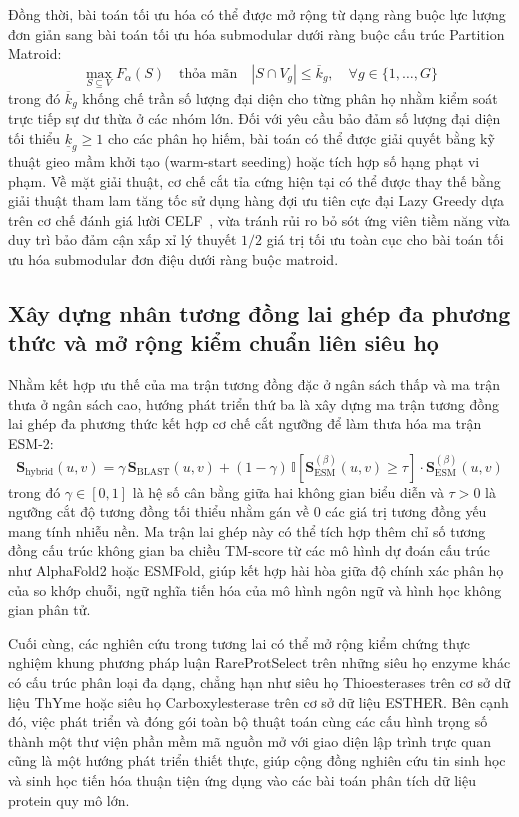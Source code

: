 Đồng thời, bài toán tối ưu hóa có thể được mở rộng từ dạng ràng buộc lực lượng đơn giản sang bài toán tối ưu hóa submodular dưới ràng buộc cấu trúc Partition Matroid:
\begin{equation}
    \max_{S \subseteq V} F_\alpha(S) \quad \text{thỏa mãn} \quad |S \cap V_g| \le \overline{k}_g, \quad \forall g \in \{1, \dots, G\}
    \label{eq:fut_matroid_constraint}
\end{equation}
trong đó $\overline{k}_g$ khống chế trần số lượng đại diện cho từng phân họ nhằm kiểm soát trực tiếp sự dư thừa ở các nhóm lớn. Đối với yêu cầu bảo đảm số lượng đại diện tối thiểu $\underline{k}_g \ge 1$ cho các phân họ hiếm, bài toán có thể được giải quyết bằng kỹ thuật gieo mầm khởi tạo (warm-start seeding) hoặc tích hợp số hạng phạt vi phạm. Về mặt giải thuật, cơ chế cắt tỉa cứng hiện tại có thể được thay thế bằng giải thuật tham lam tăng tốc sử dụng hàng đợi ưu tiên cực đại Lazy Greedy dựa trên cơ chế đánh giá lười CELF~\cite{minoux1978,leskovec2007,krause2014}, vừa tránh rủi ro bỏ sót ứng viên tiềm năng vừa duy trì bảo đảm cận xấp xỉ lý thuyết $1/2$ giá trị tối ưu toàn cục cho bài toán tối ưu hóa submodular đơn điệu dưới ràng buộc matroid.

\subsection{Xây dựng nhân tương đồng lai ghép đa phương thức và mở rộng kiểm chuẩn liên siêu họ}
\label{subsec:fut_hybrid_kernel}

Nhằm kết hợp ưu thế của ma trận tương đồng đặc ở ngân sách thấp và ma trận thưa ở ngân sách cao, hướng phát triển thứ ba là xây dựng ma trận tương đồng lai ghép đa phương thức kết hợp cơ chế cắt ngưỡng để làm thưa hóa ma trận ESM-2:
\begin{equation}
    \mathbf{S}_{\text{hybrid}}(u, v) = \gamma \, \mathbf{S}_{\text{BLAST}}(u, v) + (1 - \gamma) \, \mathbb{I}\!\left[\mathbf{S}_{\text{ESM}}^{(\beta)}(u, v) \ge \tau\right] \cdot \mathbf{S}_{\text{ESM}}^{(\beta)}(u, v)
    \label{eq:fut_hybrid_kernel}
\end{equation}
trong đó $\gamma \in [0, 1]$ là hệ số cân bằng giữa hai không gian biểu diễn và $\tau > 0$ là ngưỡng cắt độ tương đồng tối thiểu nhằm gán về $0$ các giá trị tương đồng yếu mang tính nhiễu nền. Ma trận lai ghép này có thể tích hợp thêm chỉ số tương đồng cấu trúc không gian ba chiều TM-score từ các mô hình dự đoán cấu trúc như AlphaFold2 hoặc ESMFold, giúp kết hợp hài hòa giữa độ chính xác phân họ của so khớp chuỗi, ngữ nghĩa tiến hóa của mô hình ngôn ngữ và hình học không gian phân tử.

Cuối cùng, các nghiên cứu trong tương lai có thể mở rộng kiểm chứng thực nghiệm khung phương pháp luận RareProtSelect trên những siêu họ enzyme khác có cấu trúc phân loại đa dạng, chẳng hạn như siêu họ Thioesterases trên cơ sở dữ liệu ThYme hoặc siêu họ Carboxylesterase trên cơ sở dữ liệu ESTHER. Bên cạnh đó, việc phát triển và đóng gói toàn bộ thuật toán cùng các cấu hình trọng số thành một thư viện phần mềm mã nguồn mở với giao diện lập trình trực quan cũng là một hướng phát triển thiết thực, giúp cộng đồng nghiên cứu tin sinh học và sinh học tiến hóa thuận tiện ứng dụng vào các bài toán phân tích dữ liệu protein quy mô lớn.